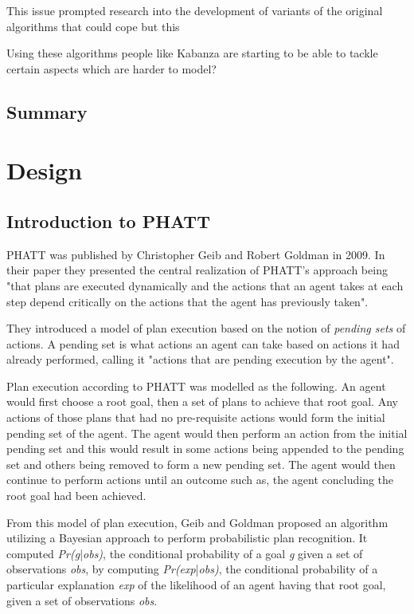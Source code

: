 \documentclass[parskip]{cs4rep}
\begin{document}
This issue prompted research into the development of variants of the original algorithms that could cope but this 

Using these algorithms people like Kabanza are starting to be able to tackle certain aspects which are harder to model?

\section{Summary}

\chapter{Design}

\section{Introduction to PHATT}

PHATT was published by Christopher Geib and Robert Goldman in 2009. In their paper they presented the central realization of PHATT's approach being "that plans are executed dynamically and the actions that an agent takes at each step depend critically on the actions that the agent has previously taken". 

They introduced a model of plan execution based on the notion of \textit{pending sets} of actions. A pending set is what actions an agent can take based on actions it had already performed, calling it "actions that are pending execution by the agent".

Plan execution according to PHATT was modelled as the following. An agent would first choose a root goal, then a set of plans to achieve that root goal. Any actions of those plans that had no pre-requisite actions would form the initial pending set of the agent. The agent would then perform an action from the initial pending set and this would result in some actions being appended to the pending set and others being removed to form a new pending set. The agent would then continue to perform actions until an outcome such as, the agent concluding the root goal had been achieved.

From this model of plan execution, Geib and Goldman proposed an algorithm utilizing a Bayesian approach to perform probabilistic plan recognition. It computed \textit{Pr(g}|\textit{obs)}, the conditional probability of a goal \textit{g} given a set of observations \textit{obs}, by computing \textit{Pr(exp}|\textit{obs)}, the conditional probability of a particular explanation \textit{exp} of the likelihood of an agent having that root goal, given a set of observations \textit{obs}.
\end{document}
